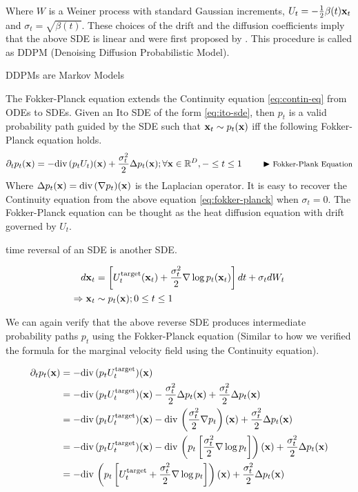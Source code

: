 \documentclass[a4paper, 11pt]{article}
\begin{document}
Where $W$ is a Weiner process with standard Gaussian increments, $U_t = -\frac{1}{2} \beta(t) \mbox{$\mbox{$\mathbf{x}$}$}_t$ and $\sigma_t = \sqrt{\beta(t)}$. These choices of the drift and the diffusion coefficients imply that the above SDE is linear and were first proposed by \cite{ho2020denoising}. This procedure is called as DDPM (Denoising Diffusion  Probabilistic Model). 

DDPMs are Markov Models


The Fokker-Planck equation extends the Continuity equation \eqref{eq:contin-eq} from ODEs to SDEs. Given an Ito SDE of the form \eqref{eq:ito-sde}, then $p_t$ is a valid probability path guided by the SDE such that $\mbox{$\mbox{$\mathbf{x}$}$}_t \sim p_t(\mbox{$\mbox{$\mathbf{x}$}$})$ iff the following Fokker-Planck equation holds.
\begin{align}
    \partial_t p_t(\mbox{$\mbox{$\mathbf{x}$}$}) = -\text{div}\, (p_t U_t)(\mbox{$\mbox{$\mathbf{x}$}$}) + \frac{\sigma_t^2}{2} \Delta p_t(\mbox{$\mbox{$\mathbf{x}$}$}); \forall \mbox{$\mbox{$\mathbf{x}$}$} \in \mathbb{R}^D, - \leq t \leq 1 \qquad \blacktriangleright\text{\footnotesize Fokker-Plank Equation} \label{eq:fokker-planck}
\end{align}
Where $\Delta p_t(\mbox{$\mbox{$\mathbf{x}$}$}) = \text{div}\, (\nabla p_t)(\mbox{$\mbox{$\mathbf{x}$}$})$ is the Laplacian operator. It is easy to recover the Continuity equation from the above equation \eqref{eq:fokker-planck} when $\sigma_t = 0$. The Fokker-Planck equation can be thought as the heat diffusion equation with drift governed by $U_t$.

time reversal of an SDE is another SDE. 

\begin{align}
    d\mbox{$\mbox{$\mathbf{x}$}$}_t &= \left [U_t^{\text{target}}(\mbox{$\mbox{$\mathbf{x}$}$}_t) + \frac{\sigma_t^2}{2} \nabla \log p_t(\mbox{$\mbox{$\mathbf{x}$}$}_t) \right ] dt + \sigma_t d W_t \\
    \Rightarrow \mbox{$\mbox{$\mathbf{x}$}$}_t &\sim p_t(\mbox{$\mbox{$\mathbf{x}$}$}); 0 \leq t \leq 1
\end{align}

We can again verify that the above reverse SDE produces intermediate probability paths $p_t$ using the Fokker-Planck equation (Similar to how we verified the formula for the marginal velocity field using the Continuity equation).

\begin{align}
    \partial_t p_t(\mbox{$\mbox{$\mathbf{x}$}$}) &= - \text{div}\,(p_t U_t^{\text{target}})(\mbox{$\mbox{$\mathbf{x}$}$}) \\
    &= - \text{div}\,(p_t U_t^{\text{target}})(\mbox{$\mbox{$\mathbf{x}$}$}) - \frac{\sigma_t^2}{2}\Delta p_t(\mbox{$\mbox{$\mathbf{x}$}$}) + \frac{\sigma_t^2}{2}\Delta p_t(\mbox{$\mbox{$\mathbf{x}$}$}) \\
    &= - \text{div}\,(p_t U_t^{\text{target}})(\mbox{$\mbox{$\mathbf{x}$}$}) - \text{div}\, \left (\frac{\sigma_t^2}{2}\nabla p_t\right )(\mbox{$\mbox{$\mathbf{x}$}$})  + \frac{\sigma_t^2}{2}\Delta p_t(\mbox{$\mbox{$\mathbf{x}$}$}) \\
    &= - \text{div}\,(p_t U_t^{\text{target}})(\mbox{$\mbox{$\mathbf{x}$}$}) - \text{div}\, \left (p_t \left [ \frac{\sigma_t^2}{2}\nabla \log p_t \right ] \right )(\mbox{$\mbox{$\mathbf{x}$}$})  + \frac{\sigma_t^2}{2}\Delta p_t(\mbox{$\mbox{$\mathbf{x}$}$}) \\
    &= - \text{div}\, \left (p_t \left [U_t^{\text{target}} + \frac{\sigma_t^2}{2} \nabla \log p_t \right ] \right )(\mbox{$\mbox{$\mathbf{x}$}$})  + \frac{\sigma_t^2}{2}\Delta p_t(\mbox{$\mbox{$\mathbf{x}$}$}) \label{eq:fp-rev-sde}
\end{align}
\end{document}
